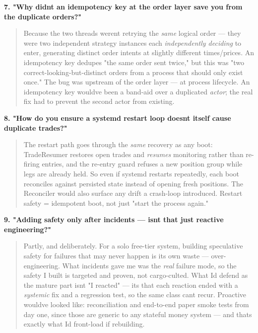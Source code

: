 \documentclass[11pt]{article}
\begin{document}
\textbf{7. "Why didn\textquotesingle t an idempotency key at the order layer save you from the duplicate orders?"}

\begin{quote}
Because the two threads weren\textquotesingle t retrying the \emph{same} logical order --- they were two independent
strategy instances each \emph{independently deciding} to enter, generating distinct order intents at
slightly different times/prices. An idempotency key dedupes "the same order sent twice," but this
was "two correct-looking-but-distinct orders from a process that should only exist once." The bug
was upstream of the order layer --- at process lifecycle. An idempotency key would\textquotesingle ve been a band-aid
over a duplicated \emph{actor}; the real fix had to prevent the second actor from existing.
\end{quote}

\textbf{8. "How do you ensure a systemd restart loop doesn\textquotesingle t itself cause duplicate trades?"}

\begin{quote}
The restart path goes through the \emph{same} recovery as any boot: TradeResumer restores open trades
and \emph{resumes} monitoring rather than re-firing entries, and the re-entry guard refuses a new
position group while legs are already held. So even if systemd restarts repeatedly, each boot
reconciles against persisted state instead of opening fresh positions. The Reconciler would also
surface any drift a crash-loop introduced. Restart safety = idempotent boot, not just "start the
process again."
\end{quote}

\textbf{9. "Adding safety only after incidents --- isn\textquotesingle t that just reactive engineering?"}

\begin{quote}
Partly, and deliberately. For a solo free-tier system, building speculative safety for failures
that may never happen is its own waste --- over-engineering. What incidents gave me was the \emph{real}
failure mode, so the safety I built is targeted and proven, not cargo-culted. What I\textquotesingle d defend as
the mature part isn\textquotesingle t "I reacted" --- it\textquotesingle s that each reaction ended with a \emph{systemic} fix and a
regression test, so the same class can\textquotesingle t recur. Proactive would\textquotesingle ve looked like: reconciliation
and end-to-end paper smoke tests from day one, since those are generic to any stateful money
system --- and that\textquotesingle s exactly what I\textquotesingle d front-load if rebuilding.
\end{quote}
\end{document}

